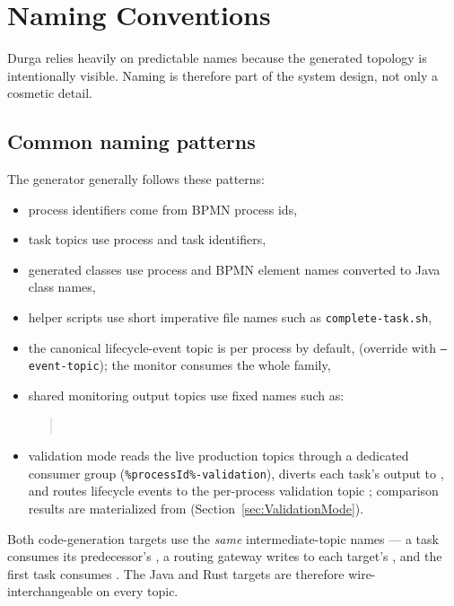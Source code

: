 \section{Naming Conventions}
\label{sec:NamingConventions}

Durga relies heavily on predictable names because the generated topology is intentionally
visible. Naming is therefore part of the system design, not only a cosmetic detail.

\subsection{Common naming patterns}

The generator generally follows these patterns:
\begin{itemize}
\item process identifiers come from BPMN process ids,
\item task topics use process and task identifiers,
\item generated classes use process and BPMN element names converted to Java class names,
\item helper scripts use short imperative file names such as \texttt{complete-task.sh},
\item the canonical lifecycle-event topic is per process by default,
 (override with \texttt{--event-topic});
the monitor consumes the whole  family,
\item shared monitoring output topics use fixed names such as:
\begin{quote}
\\
\end{quote}
\item validation mode reads the live production topics through a dedicated consumer
group (\texttt{\%processId\%-validation}), diverts each task's output to
, and routes lifecycle events to
the per-process validation topic ; comparison results are materialized
from  (Section~\ref{sec:ValidationMode}).
\end{itemize}

\noindent Both code-generation targets use the \emph{same} intermediate-topic names ---
a task consumes its predecessor's , a
routing gateway writes to each target's , and
the first task consumes . The Java and Rust targets are
therefore wire-interchangeable on every topic.

